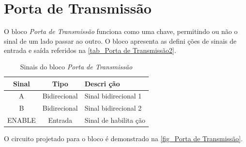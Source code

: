 \renewcommand{\NomeBloco}{\emph{Porta de Transmissão}}
\renewcommand{\NomeBlocoNoIt}{Porta de Transmissão}
\renewcommand{\NomePTab}{tab_\NomeBlocoNoIt}
\renewcommand{\NomeSTab}{tab_\NomeBlocoNoIt2}
\renewcommand{\NomePFig}{fig_\NomeBlocoNoIt}
\renewcommand{\NomeSFig}{fig_\NomeBlocoNoIt2}
\renewcommand{\NomeTTab}{tab_\NomeBlocoNoIt3}

\section{Porta de Transmissão}

O bloco \emph{\NomeBloco{}} funciona como uma chave, permitindo ou não o sinal de um lado passar ao outro. O bloco apresenta as defini ções de sinais de entrada e sa\'ida referidos na \autoref{\NomeSTab}.

\begin{table}[htbp]
\caption{Sinais do bloco \emph{\NomeBloco}}
\label{\NomeSTab}
\centering
\begin{tabular}{ccl}

    \toprule
    Sinal & Tipo    & Descri ção        \\
    \midrule \midrule
    A & Bidirecional & Sinal bidirecional 1\\
    \midrule
    B & Bidirecional & Sinal bidirecional 2\\
    \midrule
    ENABLE & Entrada & Sinal de habilita ção\\
    \bottomrule
\end{tabular}
\end{table}

O circuito projetado para o bloco \'e demonstrado na \autoref{\NomePFig}.

